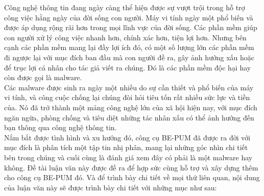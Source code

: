 Công nghệ thông tin đang ngày càng thể hiện được sự vượt trội trong hỗ trợ công việc hằng ngày của đời sống con người. Máy vi tính ngày một phổ biến và được áp dụng rộng rãi hơn trong mọi lĩnh vực của đời sống. Các phần mềm giúp con người xử lý công việc nhanh hơn, chính xác hơn, tiện lợi hơn. Nhưng bên cạnh các phần mềm mang lại đầy lợi ích đó, có một số lượng lớn các phần mềm đi ngược lại với mục đích ban đầu mà con người đề ra, gây ảnh hưởng xấu hoặc để trục lợi cá nhân cho tác giả viết ra chúng. Đó là các phần mềm độc hại hay còn được gọi là malware.\\

Các malware được sinh ra ngày một nhiều do sự cần thiết và phổ biến của máy vi tính, và công cuộc chống lại chúng đòi hỏi tiêu tốn rất nhiều sức lực và tiền của. Nó đã trở thành một mảng công nghệ lớn của xã hội hiện nay, với mục đích ngăn ngừa, phòng chống và tiêu diệt những tác nhân xấu có thể ảnh hưởng đến bạn thông qua công nghệ thông tin.\\

Nắm bắt được tình hình và xu hướng đó, công cụ BE-PUM đã được ra đời với mục đích là phân tích một tập tin nhị phân, mang lại những góc nhìn chi tiết bên trong chúng và cuối cùng là đánh giá xem đây có phải là một malware hay không. Đề tài luận văn này được đề ra để hợp sức cùng hỗ trợ và xây dựng thêm cho công cụ BE-PUM đó. Và để trình bày chi tiết về mọi thứ liên quan, nội dung của luận văn này sẽ được trình bày chi tiết với những mục như sau:

